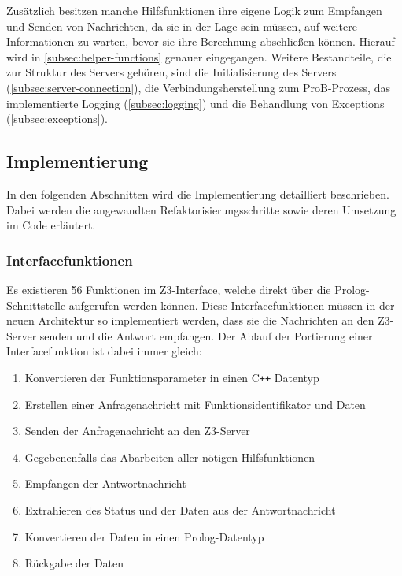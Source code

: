 Zusätzlich besitzen manche Hilfsfunktionen ihre eigene Logik zum Empfangen und Senden von Nachrichten,
da sie in der Lage sein müssen, auf weitere Informationen zu warten, bevor sie ihre Berechnung abschließen können.
Hierauf wird in \cref{subsec:helper-functions} genauer eingegangen.
Weitere Bestandteile, die zur Struktur des Servers gehören, sind die Initialisierung des Servers (\cref{subsec:server-connection}), die Verbindungsherstellung zum ProB-Prozess,
das implementierte Logging (\cref{subsec:logging}) und die Behandlung von Exceptions (\cref{subsec:exceptions}).
\vspace{3em}
\subsection{Implementierung}

In den folgenden Abschnitten wird die Implementierung detailliert beschrieben.
Dabei werden die angewandten Refaktorisierungsschritte sowie deren Umsetzung im Code erläutert.
\clearpage
\subsubsection{Interfacefunktionen}

Es existieren 56 Funktionen im Z3-Interface, welche direkt über die Prolog-Schnittstelle aufgerufen werden können.
Diese Interfacefunktionen müssen in der neuen Architektur so implementiert werden, dass sie die Nachrichten an den Z3-Server senden und die Antwort empfangen.
Der Ablauf der Portierung einer Interfacefunktion ist dabei immer gleich:

\begin{enumerate}
  \item Konvertieren der Funktionsparameter in einen C\texttt{++} Datentyp
  \item Erstellen einer Anfragenachricht mit Funktionsidentifikator und Daten
  \item Senden der Anfragenachricht an den Z3-Server
  \item Gegebenenfalls das Abarbeiten aller nötigen Hilfsfunktionen
  \item Empfangen der Antwortnachricht
  \item Extrahieren des Status und der Daten aus der Antwortnachricht
  \item Konvertieren der Daten in einen Prolog-Datentyp
  \item Rückgabe der Daten
\end{enumerate}


